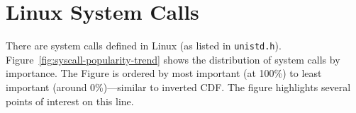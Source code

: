 \section{Linux System Calls}
\label{sec:study:syscall}


There are \syscallnum{} system calls defined in \osarch{} Linux  (as listed in {\tt unistd.h}). 
Figure~\ref{fig:syscall-popularity-trend} shows the 
distribution of system calls by importance.
The Figure is ordered by most important (at 100\%) to least important (around 0\%)---similar
to inverted CDF.
The figure highlights several points of interest on this line.

